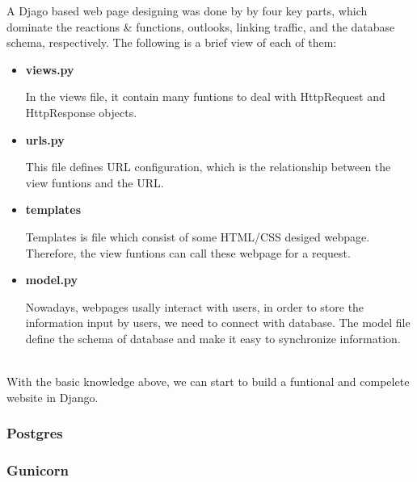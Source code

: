 A Djago based web page designing was done by by four key parts, which dominate the reactions \& functions, outlooks, linking traffic, and the database schema, respectively. The following is a brief view of each of them:
\begin{itemize}
		\item[] \textbf{views.py}
		
			  In the views file, it contain many funtions to deal with HttpRequest and  HttpResponse objects.
		\item[] \textbf{urls.py}
		
			  This file defines URL configuration, which is the relationship between the view funtions and the URL.
		\item[] \textbf{templates}
		
			  Templates is file which consist of some HTML/CSS desiged webpage. Therefore, the view funtions can call these webpage for a request.
		\item[] \textbf{model.py}
		
			  Nowadays, webpages usally interact with users, in order to store the information input by users, we need to connect with database. The model file define the schema of database and make it easy to synchronize information.\\\\
\end{itemize}
With the basic knowledge above, we can start to build a funtional and compelete website in Django.

\subsubsection*{Postgres}
\subsubsection*{Gunicorn}